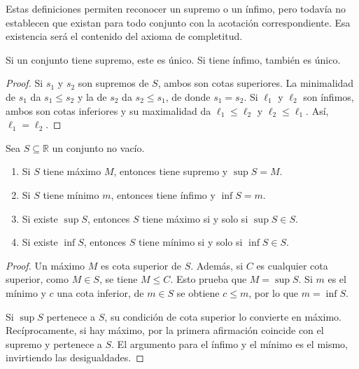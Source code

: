 Estas definiciones permiten reconocer un supremo o un ínfimo, pero todavía no establecen que existan para todo conjunto con la acotación correspondiente. Esa existencia será el contenido del axioma de completitud.

\begin{samepage}
\begin{proposition}
\label{prop:unicidad-supremo}
Si un conjunto tiene supremo, este es único. Si tiene ínfimo, también es único.
\end{proposition}
\end{samepage}

\begin{proof}
Si $s_1$ y $s_2$ son supremos de $S$, ambos son cotas superiores. La minimalidad de $s_1$ da $s_1\leq s_2$ y la de $s_2$ da $s_2\leq s_1$, de donde $s_1=s_2$. Si $\ell_1$ y $\ell_2$ son ínfimos, ambos son cotas inferiores y su maximalidad da $\ell_1\leq\ell_2$ y $\ell_2\leq\ell_1$. Así, $\ell_1=\ell_2$.
\end{proof}

\begin{samepage}
\begin{proposition}
\label{prop:extremos-alcanzados}
Sea $S\subseteq\mathbb{R}$ un conjunto no vacío.
\begin{enumerate}
    \item Si $S$ tiene máximo $M$, entonces tiene supremo y $\sup S=M$.
    \item Si $S$ tiene mínimo $m$, entonces tiene ínfimo y $\inf S=m$.
    \item Si existe $\sup S$, entonces $S$ tiene máximo si y solo si $\sup S\in S$.
    \item Si existe $\inf S$, entonces $S$ tiene mínimo si y solo si $\inf S\in S$.
\end{enumerate}
\end{proposition}
\end{samepage}

\begin{proof}
Un máximo $M$ es cota superior de $S$. Además, si $C$ es cualquier cota superior, como $M\in S$, se tiene $M\leq C$. Esto prueba que $M=\sup S$. Si $m$ es el mínimo y $c$ una cota inferior, de $m\in S$ se obtiene $c\leq m$, por lo que $m=\inf S$.

Si $\sup S$ pertenece a $S$, su condición de cota superior lo convierte en máximo. Recíprocamente, si hay máximo, por la primera afirmación coincide con el supremo y pertenece a $S$. El argumento para el ínfimo y el mínimo es el mismo, invirtiendo las desigualdades.
\end{proof}

